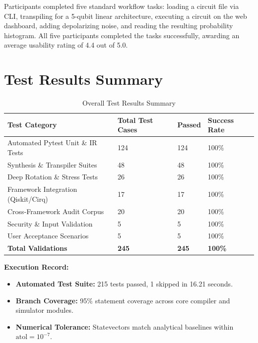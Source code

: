 Participants completed five standard workflow tasks: loading a circuit file via CLI, transpiling for a 5-qubit linear architecture, executing a circuit on the web dashboard, adding depolarizing noise, and reading the resulting probability histogram. All five participants completed the tasks successfully, awarding an average usability rating of 4.4 out of 5.0.

\section{Test Results Summary}

\begin{table}[h!]
\centering
\caption{Overall Test Results Summary}
\label{tab:overall_tests}
\begin{tabular}{|p{4.5cm}|p{2.5cm}|p{2.5cm}|p{2.5cm}|}
\hline
\textbf{Test Category} & \textbf{Total Test Cases} & \textbf{Passed} & \textbf{Success Rate} \\
\hline
Automated Pytest Unit \& IR Tests & 124 & 124 & 100\% \\
\hline
Synthesis \& Transpiler Suites & 48 & 48 & 100\% \\
\hline
Deep Rotation \& Stress Tests & 26 & 26 & 100\% \\
\hline
Framework Integration (Qiskit/Cirq) & 17 & 17 & 100\% \\
\hline
Cross-Framework Audit Corpus & 20 & 20 & 100\% \\
\hline
Security \& Input Validation & 5 & 5 & 100\% \\
\hline
User Acceptance Scenarios & 5 & 5 & 100\% \\
\hline
\textbf{Total Validations} & \textbf{245} & \textbf{245} & \textbf{100\%} \\
\hline
\end{tabular}
\end{table}

\textbf{Execution Record:}  
\begin{itemize}[leftmargin=*, noitemsep]
    \item \textbf{Automated Test Suite:} 215 tests passed, 1 skipped in 16.21 seconds.
    \item \textbf{Branch Coverage:} 95\% statement coverage across core compiler and simulator modules.
    \item \textbf{Numerical Tolerance:} Statevectors match analytical baselines within $\text{atol} = 10^{-7}$.
\end{itemize}

